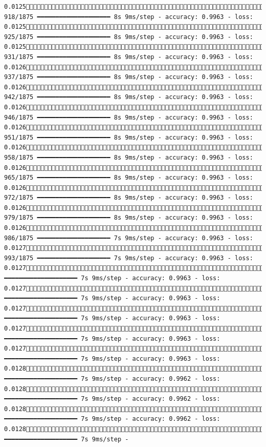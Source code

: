 \documentclass[
  letterpaper,
  DIV=11,
  numbers=noendperiod]{scrreprt}
\begin{document}
\begin{verbatim}
0.0125 918/1875 ━━━━━━━━━━━━━━━━━━━━ 8s 9ms/step - accuracy: 0.9963 - loss: 0.0125 925/1875 ━━━━━━━━━━━━━━━━━━━━ 8s 9ms/step - accuracy: 0.9963 - loss: 0.0125 931/1875 ━━━━━━━━━━━━━━━━━━━━ 8s 9ms/step - accuracy: 0.9963 - loss: 0.0126 937/1875 ━━━━━━━━━━━━━━━━━━━━ 8s 9ms/step - accuracy: 0.9963 - loss: 0.0126 942/1875 ━━━━━━━━━━━━━━━━━━━━ 8s 9ms/step - accuracy: 0.9963 - loss: 0.0126 946/1875 ━━━━━━━━━━━━━━━━━━━━ 8s 9ms/step - accuracy: 0.9963 - loss: 0.0126 951/1875 ━━━━━━━━━━━━━━━━━━━━ 8s 9ms/step - accuracy: 0.9963 - loss: 0.0126 958/1875 ━━━━━━━━━━━━━━━━━━━━ 8s 9ms/step - accuracy: 0.9963 - loss: 0.0126 965/1875 ━━━━━━━━━━━━━━━━━━━━ 8s 9ms/step - accuracy: 0.9963 - loss: 0.0126 972/1875 ━━━━━━━━━━━━━━━━━━━━ 8s 9ms/step - accuracy: 0.9963 - loss: 0.0126 979/1875 ━━━━━━━━━━━━━━━━━━━━ 8s 9ms/step - accuracy: 0.9963 - loss: 0.0126 986/1875 ━━━━━━━━━━━━━━━━━━━━ 7s 9ms/step - accuracy: 0.9963 - loss: 0.0127 993/1875 ━━━━━━━━━━━━━━━━━━━━ 7s 9ms/step - accuracy: 0.9963 - loss: 0.01271000/1875 ━━━━━━━━━━━━━━━━━━━━ 7s 9ms/step - accuracy: 0.9963 - loss: 0.01271008/1875 ━━━━━━━━━━━━━━━━━━━━ 7s 9ms/step - accuracy: 0.9963 - loss: 0.01271015/1875 ━━━━━━━━━━━━━━━━━━━━ 7s 9ms/step - accuracy: 0.9963 - loss: 0.01271022/1875 ━━━━━━━━━━━━━━━━━━━━ 7s 9ms/step - accuracy: 0.9963 - loss: 0.01271029/1875 ━━━━━━━━━━━━━━━━━━━━ 7s 9ms/step - accuracy: 0.9963 - loss: 0.01281036/1875 ━━━━━━━━━━━━━━━━━━━━ 7s 9ms/step - accuracy: 0.9962 - loss: 0.01281043/1875 ━━━━━━━━━━━━━━━━━━━━ 7s 9ms/step - accuracy: 0.9962 - loss: 0.01281050/1875 ━━━━━━━━━━━━━━━━━━━━ 7s 9ms/step - accuracy: 0.9962 - loss: 0.01281057/1875 ━━━━━━━━━━━━━━━━━━━━ 7s 9ms/step - 
\end{verbatim}
\end{document}
